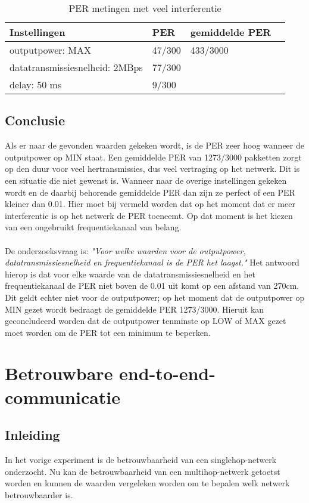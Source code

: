\documentclass{article}
\begin{document}
\begin{table}[h]
\centering \caption{PER metingen met veel interferentie}
\label{table:interferentie}
\begin{tabular}{ | l | l | l | p{5cm} |}
    \hline
    Instellingen				& PER 		& gemiddelde PER\\ \hline
    outputpower: MAX 			& 47/300 	& 433/3000		\\ 
    datatransmissiesnelheid: 2MBps 	& 77/300 	&  				\\ 
    delay: 50 ms 				& 9/300 	&  				\\ \hline
\end{tabular}
\end{table}

\subsection{Conclusie}
Als er naar de gevonden waarden gekeken wordt, is de PER zeer hoog wanneer de outputpower op MIN staat. Een gemiddelde PER van 1273/3000 pakketten zorgt op den duur voor veel hertransmissies, dus veel vertraging op het netwerk. Dit is een situatie die niet gewenst is. Wanneer naar de overige instellingen gekeken wordt en de daarbij behorende gemiddelde PER dan zijn ze perfect of een PER kleiner dan 0.01. Hier moet bij vermeld worden dat op het moment dat er meer interferentie is op het netwerk de PER toeneemt. Op dat moment is het kiezen van een ongebruikt frequentiekanaal van belang.\\
\\
De onderzoeksvraag is: \textit{"Voor welke waarden voor de outputpower, datatransmissiesnelheid en frequentiekanaal is de PER het laagst."} Het antwoord hierop is dat voor elke waarde van de datatransmissiesnelheid en het frequentiekanaal de PER niet boven de 0.01 uit komt op een afstand van 270cm. Dit geldt echter niet voor de outputpower; op het moment dat de outputpower op MIN gezet wordt bedraagt de gemiddelde PER 1273/3000. Hieruit kan geconcludeerd worden dat de outputpower tenminste op LOW of MAX gezet moet worden om de PER tot een minimum te beperken. 

\newpage

\clearpage
\section{Betrouwbare end-to-end-communicatie}

\subsection{Inleiding}
In het vorige experiment is de betrouwbaarheid van een singlehop-netwerk onderzocht. Nu kan de betrouwbaarheid van een multihop-netwerk getoetst worden en kunnen de waarden vergeleken worden om te bepalen welk netwerk betrouwbaarder is. 
\end{document}
